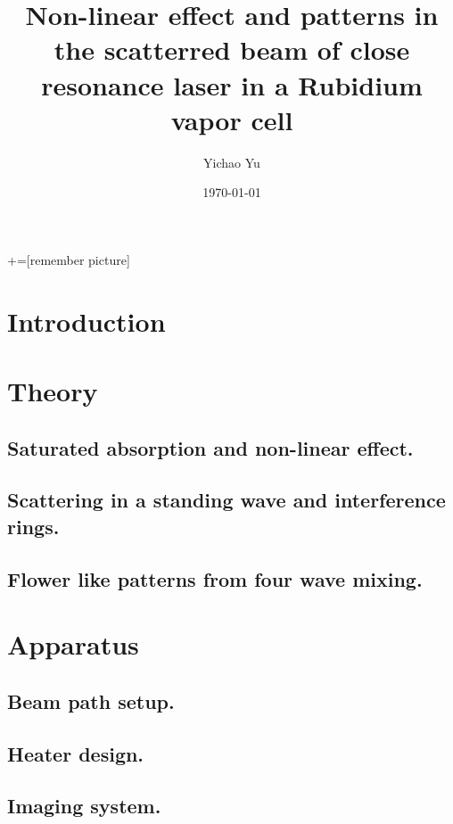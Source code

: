 \documentclass[aps,twocolumn,secnumarabic,balancelastpage,amsmath,amssymb,nofootinbib]{revtex4}
\begin{document}
+=[remember picture]
\title{Non-linear effect and patterns in the scatterred beam of close resonance laser in a Rubidium vapor cell}
\author{Yichao Yu}
\date{\today}

\begin{abstract}
\end{abstract}

\maketitle
\section*{Introduction}

\section{Theory}
\subsection{Saturated absorption and non-linear effect.}
\subsection{Scattering in a standing wave and interference rings.}
\subsection{Flower like patterns from four wave mixing.}

\section{Apparatus}
\subsection{Beam path setup.}
\subsection{Heater design.}
\subsection{Imaging system.}
\end{document}
